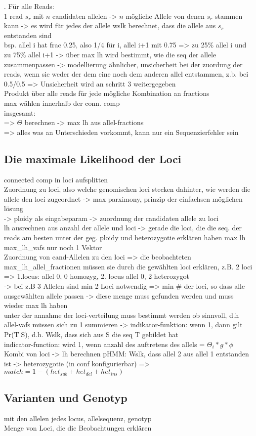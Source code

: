 . Für alle Reads: \\
1 read $s_{r}$ mit $n$ candidaten allelen -> $n$ mögliche Allele von denen $s_{r}$ stammen kann -> es wird für jedes der allele wslk berechnet, dass die allele aus $s_{r}$ entstanden sind\\
bsp. allel i hat frac 0.25, also 1/4 für i, allel i+1 mit 0.75 => zu 25\% allel i und zu 75\% allel i+1 -> über max lh wird bestimmt, wie die seq der allele zusammenpassen -> modellierung ähnlicher,  unsicherheit bei der zuordung der reads, wenn sie weder der dem eine noch dem anderen allel entstammen, z.b. bei 0.5/0.5 => Unsicherheit wird an schritt 3 weitergegeben \\
Produkt über alle reads für jede mögliche Kombination an fractions \\
max wählen innerhalb der conn. comp\\
insgesamt:\\
=> $\Theta$ berechnen -> max lh aus allel-fractions\\
=> alles was an Unterschieden vorkommt, kann nur ein Sequenzierfehler sein\\
\subsection{Die maximale Likelihood der Loci}
connected comp in loci aufsplitten\\
Zuordnung zu loci, also welche genomischen loci stecken dahinter, wie werden die allele den loci zugeordnet -> max parximony, prinzip der einfachsen möglichen lösung \\
-> ploidy als eingabeparam -> zuordnung der candidaten allele zu loci\\
lh ausrechnen aus anzahl der allele und loci -> gerade die loci, die die seq. der reads am besten unter der geg. ploidy und heterozygotie erklären haben max lh
max\_lh\_vafs nur noch 1 Vektor\\
Zuordnung von cand-Allelen zu den loci => die beobachteten max\_lh\_allel\_fractionen müssen sie durch die gewählten loci erklären, z.B. 2 loci => 1.locus: allel 0, 0 homozyg, 2. locus allel 0, 2 heterozygot\\
-> bei z.B 3 Allelen sind min 2 Loci notwendig => min \# der loci, so dass alle ausgewählten allele passen -> diese menge muss gefunden werden und muss wieder max lh haben\\
unter der annahme der loci-verteilung muss bestimmt werden ob sinnvoll, d.h allel-vafs müssen sich zu 1 summieren -> indikator-funktion: wenn 1, dann gilt Pr(T|S), d.h. Wslk, dass sich aus S die seq T gebildet hat\\
indicator-function: wird 1, wenn anzahl des auftretens des allels = $\Theta_{i} * g * \phi$ 
Kombi von loci -> lh berechnen
pHMM: Wslk, dass allel 2 aus allel 1 entstanden ist -> heterozygotie (in conf konfigurierbar) =>$ match = 1 - (het_{sub} + het_{del} + het_{ins}) $

\subsection{Varianten und Genotyp}
mit den allelen jedes locus, allelsequenz, genotyp\\
Menge von Loci, die die Beobachtungen erklären